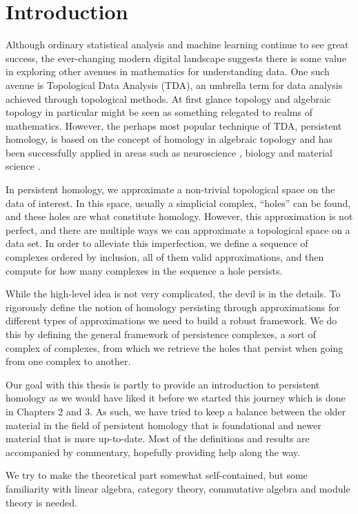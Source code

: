 \chapter{Introduction}
Although ordinary statistical analysis and machine learning continue to see great success, the ever-changing modern digital landscape suggests there is some value in exploring other avenues in mathematics for understanding data. One such avenue is Topological Data Analysis (TDA), an umbrella term for data analysis achieved through topological methods. At first glance topology and algebraic topology in particular might be seen as something relegated to realms of mathematics. However, the perhaps most popular technique of TDA, persistent homology, is based on the concept of homology in algebraic topology and has been successfully applied in areas such as neuroscience \cite{reimann}, biology \cite{plants} and material science \cite{moon2019}.

In persistent homology, we approximate a non-trivial topological space on the data of interest. In this space, usually a simplicial complex, ``holes'' can be found, and these holes are what constitute homology. However, this approximation is not perfect, and there are multiple ways we can approximate a topological space on a data set. In order to alleviate this imperfection, we define a sequence of complexes ordered by inclusion, all of them valid approximations, and then compute for how many complexes in the sequence a hole persists.

While the high-level idea is not very complicated, the devil is in the details. To rigorously define the notion of homology persisting through approximations for different types of approximations we need to build a robust framework. We do this by defining the general framework of persistence complexes, a sort of complex of complexes, from which we retrieve the holes that persist when going from one complex to another.


Our goal with this thesis is partly to provide an introduction to persistent homology as we would have liked it before we started this journey which is done in Chapters 2 and 3. As such, we have tried to keep a balance between the older material in the field of persistent homology that is foundational and newer material that is more up-to-date. Most of the definitions and results are accompanied by commentary, hopefully providing help along the way.

We try to make the theoretical part somewhat self-contained, but some familiarity with linear algebra, category theory, commutative algebra and module theory is needed.

